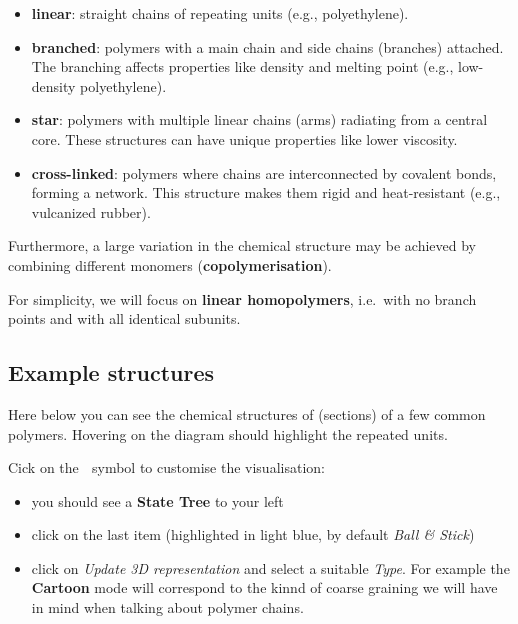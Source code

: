 \documentclass[
  letterpaper,
  enabledeprecatedfontcommands]{report}
\providecommand{\tightlist}{%
  \setlength{\itemsep}{0pt}\setlength{\parskip}{0pt}}
\begin{document}
\begin{itemize}
\item
  \textbf{linear}: straight chains of repeating units (e.g.,
  polyethylene).
\item
  \textbf{branched}: polymers with a main chain and side chains
  (branches) attached. The branching affects properties like density and
  melting point (e.g., low-density polyethylene).
\item
  \textbf{star}: polymers with multiple linear chains (arms) radiating
  from a central core. These structures can have unique properties like
  lower viscosity.
\item
  \textbf{cross-linked}: polymers where chains are interconnected by
  covalent bonds, forming a network. This structure makes them rigid and
  heat-resistant (e.g., vulcanized rubber).
\end{itemize}

Furthermore, a large variation in the chemical structure may be achieved
by combining different monomers (\textbf{copolymerisation}).

For simplicity, we will focus on \textbf{linear homopolymers}, i.e.~with
no branch points and with all identical subunits.

\subsection{Example structures}\label{example-structures}

Here below you can see the chemical structures of (sections) of a few
common polymers. Hovering on the diagram should highlight the repeated
units.

\begin{tcolorbox}[enhanced jigsaw, toprule=.15mm, opacityback=0, colbacktitle=quarto-callout-note-color!10!white, title=\textcolor{quarto-callout-note-color}{\faInfo}\hspace{0.5em}{How to use the visualisers}, leftrule=.75mm, rightrule=.15mm, bottomtitle=1mm, breakable, colframe=quarto-callout-note-color-frame, colback=white, toptitle=1mm, left=2mm, titlerule=0mm, coltitle=black, arc=.35mm, bottomrule=.15mm, opacitybacktitle=0.6]

Cick on the 🔧 symbol to customise the visualisation:

\begin{itemize}
\tightlist
\item
  you should see a \textbf{State Tree} to your left
\item
  click on the last item (highlighted in light blue, by default
  \emph{Ball \& Stick})
\item
  click on \emph{Update 3D representation} and select a suitable
  \emph{Type}. For example the \textbf{Cartoon} mode will correspond to
  the kinnd of coarse graining we will have in mind when talking about
  polymer chains.
\end{itemize}

\end{tcolorbox}
\end{document}
